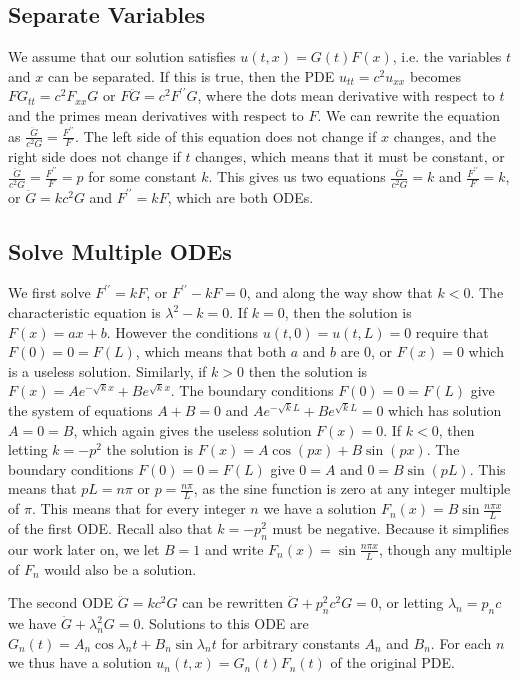 \subsection{Separate Variables}
We assume that our solution satisfies $u(t,x)=G(t)F(x)$, i.e. the variables $t$ and $x$ can be separated.  If this is true, then the PDE  $u_{tt}  = c^2u_{xx}$ becomes $FG_{tt} = c^2F_{xx}G$ or $F\ddot{G}=c^2F^{\prime\prime}G$, where the dots mean derivative with respect to $t$ and the primes mean derivatives with respect to $F$. We can rewrite the equation as $\frac{\ddot{G}}{c^2G} = \frac{F^{\prime\prime}}{F}$. The left side of this equation does not change if $x$ changes, and the right side does not change if $t$ changes, which means that it must be constant, or $\frac{\ddot{G}}{c^2G} = \frac{F^{\prime\prime}}{F}=p$ for some constant $k$.  This gives us two equations $\frac{\ddot{G}}{c^2G}=k$ and $\frac{F^{\prime\prime}}{F}=k$, or $\ddot{G} = kc^2G$ and $F^{\prime\prime}=kF$,  which are both ODEs.
\subsection{Solve Multiple ODEs}
We first solve $F^{\prime\prime}=kF$, or $F^{\prime\prime}-kF=0$, and along the way show that $k<0$. The characteristic equation is $\lambda^2-k=0$.  If $k=0$, then the solution is $F(x) = ax+b$.  However the conditions $u(t,0)=u(t,L) = 0$ require that $F(0)=0=F(L)$, which means that both $a$ and $b$ are 0, or $F(x)=0$ which is a useless solution.  Similarly, if $k>0$ then the solution is $F(x) = Ae^{-\sqrt{k} x}+Be^{\sqrt k x}$.  The boundary conditions $F(0)=0=F(L)$ give the system of equations $A+B=0$ and $Ae^{-\sqrt{k} L}+Be^{\sqrt k L}=0$ which has solution $A=0=B$, which again gives the useless solution $F(x)=0$.  If $k<0$, then letting $k=-p^2$ the solution is $F(x) = A\cos(px)+B\sin(px)$.  The boundary conditions $F(0)=0=F(L)$ give $0=A$ and $0=B\sin(pL)$.  This means that $pL=n\pi$ or $p=\frac{n\pi}{L}$, as the sine function is zero at any integer multiple of $\pi$.  This means that for every integer $n$ we have a solution $F_n(x) =B\sin\frac{n\pi x}{L}$ of the first ODE. Recall also that $k=-p_n^2$ must be negative. Because it simplifies our work later on, we let $B=1$ and write $F_n(x) =\sin\frac{n\pi x}{L}$, though any multiple of $F_n$ would also be a solution.

The second ODE $\ddot{G} = kc^2G$ can be rewritten $\ddot{G} + p_n^2c^2G = 0$, or letting $\lambda_n=p_nc$ we have $\ddot{G} + \lambda_n^2G = 0$.  Solutions to this ODE are $G_n(t) = A_n\cos\lambda_n t+B_n\sin\lambda_n t$ for arbitrary constants $A_n$ and $B_n$. 
For each $n$ we thus have a solution $u_n(t,x)=G_n(t)F_n(t)$ of the original PDE.

